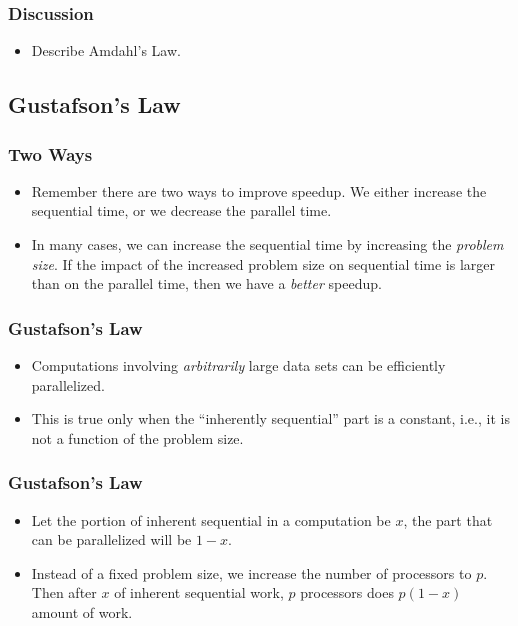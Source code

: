 \documentclass{beamer}
\begin{document}
\begin{CJK}{UTF8}{bsmi}
\begin{frame}
\frametitle{Discussion}
\begin{itemize}
\item Describe Amdahl's Law.
\end{itemize}
\end{frame}

\subsection{Gustafson's Law} 

\begin{frame}
\frametitle{Two Ways}
\begin{itemize}
\item Remember there are two ways to improve speedup.  We either increase the sequential time, or we decrease the parallel time.
\item In many cases, we can increase the sequential time by increasing the {\em problem size}.  
If the impact of the increased problem size on sequential time is larger than on the parallel time, then we have a {\em better} speedup.
\end{itemize}
\end{frame}

\begin{frame}
\frametitle{Gustafson's Law} 
\begin{itemize}
\item Computations involving {\em arbitrarily} large data sets can be
  efficiently parallelized.
\item This is true only when the ``inherently sequential'' part is a
  constant, i.e., it is not a function of the problem size.
\end{itemize}
\end{frame}

\begin{frame}
\frametitle{Gustafson's Law} 
\begin{itemize}
\item Let the portion of inherent sequential in a computation be $x$,
  the part that can be parallelized will be $1 - x$.
\item Instead of a fixed problem size, we increase the number of
  processors to $p$.  Then after $x$ of inherent sequential work, $p$
  processors does $p (1 - x)$ amount of work.
\end{itemize}
\end{frame}


\end{CJK}
\end{document}

